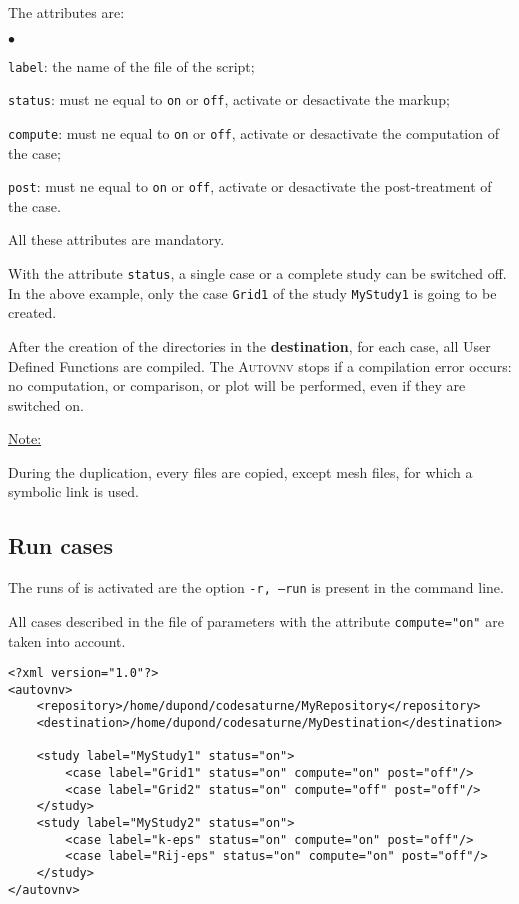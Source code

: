 \documentclass[a4paper,10pt,twoside]{article}
\begin{document}
The attributes are:
\begin{list}{$\bullet$}{}
\item \texttt{label}: the name of the file of the script;
\item \texttt{status}: must ne equal to \texttt{on} or \texttt{off},
activate or desactivate the markup;
\item \texttt{compute}: must ne equal to \texttt{on} or \texttt{off},
activate or desactivate the computation of the case;
\item \texttt{post}: must ne equal to \texttt{on} or \texttt{off},
activate or desactivate the post-treatment of the case.
\end{list}

All these attributes are mandatory.

With the attribute \texttt{status}, a single case or a complete study can be switched off.
In the above example, only the case \texttt{Grid1} of the study \texttt{MyStudy1} is going
to be created.

After the creation of the directories in the \textbf{destination}, for each case, all User Defined Functions
are compiled. The \textsc{Autovnv} stops if a compilation error occurs: no computation, or
comparison, or plot will be performed, even if they are switched on.

\underline{Note:}

During the duplication, every files are copied, except mesh files, for which a symbolic link is used.


\subsection{Run cases}

The runs of \CS is activated are the option \texttt{-r, --run} is present in the command line.

All cases described in the file of parameters with the attribute \texttt{compute="on"}
are taken into account.

\begin{verbatim}
<?xml version="1.0"?>
<autovnv>
    <repository>/home/dupond/codesaturne/MyRepository</repository>
    <destination>/home/dupond/codesaturne/MyDestination</destination>

    <study label="MyStudy1" status="on">
        <case label="Grid1" status="on" compute="on" post="off"/>
        <case label="Grid2" status="on" compute="off" post="off"/>
    </study>
    <study label="MyStudy2" status="on">
        <case label="k-eps" status="on" compute="on" post="off"/>
        <case label="Rij-eps" status="on" compute="on" post="off"/>
    </study>
</autovnv>
\end{verbatim}
\end{document}
